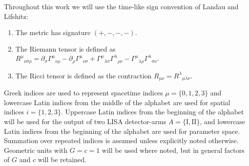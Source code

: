 Throughout this work we will use the time-like sign convention of Landau and Lifshitz\cite{Landau1975}:
\begin{enumerate}
\item The metric has signature $(+,-,-,-)$.
\item The Riemann tensor is defined as ${R^\mu}_{\nu\sigma\rho} = \partial_\sigma {\Gamma^\mu}_{\nu\rho} - \partial_\rho {\Gamma^\mu}_{\nu\sigma} + {\Gamma^\mu}_{\lambda\sigma}{\Gamma^\lambda}_{\rho\nu} - {\Gamma^\mu}_{\lambda\rho}{\Gamma^\lambda}_{\sigma\nu}$.
\item The Ricci tensor is defined as the contraction $R_{\mu\nu} = {R^\lambda}_{\mu\lambda\nu}$.
\end{enumerate}
Greek indices are used to represent spacetime indices $\mu = \{0,1,2,3\}$ and lowercase Latin indices from the middle of the alphabet are used for spatial indices $i = \{1,2,3\}$. Uppercase Latin indices from the beginning of the alphabet will be used for the output of two LISA detector-arms $A = \{\mathrm{I}, \mathrm{II}\}$, and lowercase Latin indices from the beginning of the alphabet are used for parameter space. Summation over repeated indices is assumed unless explicitly noted otherwise. Geometric units with $G = c = 1$ will be used where noted, but in general factors of $G$ and $c$ will be retained.
